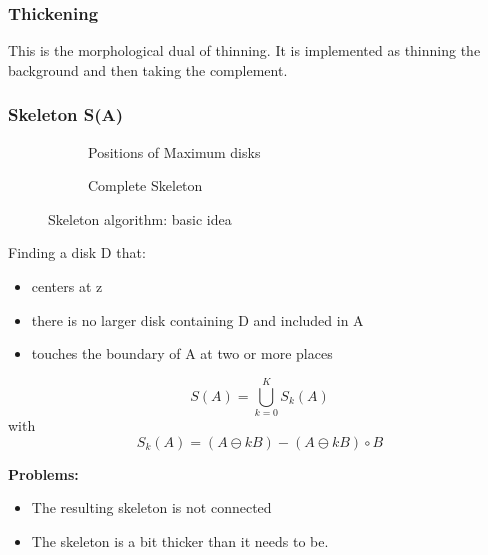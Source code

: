 \subsubsection{Thickening}
This is the morphological dual of thinning. It is implemented as thinning the background and then taking the complement.

\subsubsection{Skeleton S(A)}
\begin{figure}[h!]
\centering
\begin{subfigure}[b]{0.45\textwidth}
\centering
{}
\caption{Positions of Maximum disks}
\end{subfigure}
\begin{subfigure}[b]{0.45\textwidth}
\centering
{}
\caption{Complete Skeleton}
\end{subfigure}
\caption{Skeleton algorithm: basic idea}
\end{figure}
Finding a disk D that:
\begin{itemize}
\item centers at z
\item there is no larger disk containing D and included in A
\item touches the boundary of A at two or more places
\end{itemize}
	\[
		S(A) = \bigcup_{k=0}^{K} S_k(A)
	\]
with
	\[
		S_k(A) = (A \ominus kB) - (A \ominus kB) \circ B
	\]
	
\textbf{Problems:}
\begin{itemize}
	\item The resulting skeleton is not connected
	\item The skeleton is a bit thicker than it needs to be.
\end{itemize}
	
